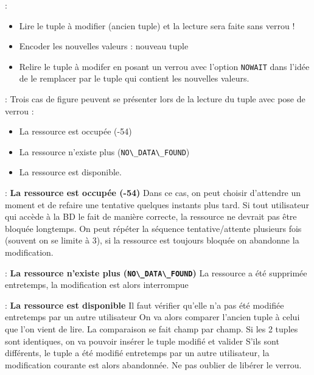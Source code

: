 \documentclass[10pt]{beamer}
\begin{document}
\begin{frame}{\secname : \subsecname}
    \begin{itemize}
        \item  Lire le tuple à modifier (ancien tuple) et la lecture sera faite sans verrou !
        \item Encoder les nouvelles valeurs : nouveau tuple
        \item Relire le tuple à modifer en posant un verrou avec l'option \lstinline[language=plsql]!NOWAIT! dans l'idée de le remplacer par le tuple qui contient les nouvelles valeurs.
    \end{itemize}
\end{frame}

\begin{frame}{\secname : \subsecname}
    Trois cas de figure peuvent se présenter lors de la lecture du tuple avec pose de verrou :
    \begin{itemize}
        \item La ressource est occupée (-54)
        \item La ressource n'existe plus (\lstinline[language=plsql]!NO\_DATA\_FOUND!)
        \item La ressource est disponible.
    \end{itemize}
\end{frame}

\begin{frame}{\secname : \subsecname}
    \textbf{La ressource est occupée (-54)}
    Dans ce cas, on peut choisir d'attendre un moment et de refaire une tentative quelques instants plus tard.
    Si tout utilisateur qui accède à la BD le fait de manière correcte, la ressource ne devrait pas être bloquée longtemps.
    On peut répéter la séquence tentative/attente plusieurs fois (souvent on se limite à 3), si la ressource est toujours bloquée on abandonne la modification.
\end{frame}

\begin{frame}{\secname : \subsecname}
    \textbf{La ressource n'existe plus (\lstinline[language=plsql]!NO\_DATA\_FOUND!)}
    La ressource a été supprimée entretemps, la modification est alors interrompue
\end{frame}
\begin{frame}{\secname : \subsecname}
    \textbf{La ressource est disponible}
    Il faut vérifier qu'elle n'a pas été modifiée entretemps par un autre utilisateur
    On va alors comparer l'ancien tuple à celui que l'on vient de lire.  La comparaison se fait champ par champ.
    Si les 2 tuples sont identiques, on va pouvoir insérer le tuple modifié et valider
    S'ils sont différents, le tuple a été modifié entretemps par un autre utilisateur, la modification courante est alors abandonnée.  Ne pas oublier de libérer le verrou.
\end{frame}


\end{document}
